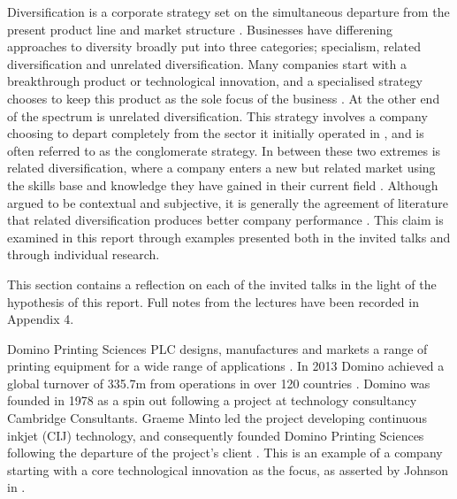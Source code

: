 \documentclass{elec6049Report}     %
\newcommand{\inote}[1] {\todo[inline]{#1}}
\begin{document}
Diversification is a corporate strategy set on the simultaneous departure from the present product line and market structure \cite{ansoff1957strategies}.
Businesses have differening approaches to diversity broadly put into three categories; specialism, related diversification and unrelated diversification. 
Many companies start with a breakthrough product or technological innovation, and a specialised strategy chooses to keep this product as the sole focus of the business \cite{johnson2008exploring}.
At the other end of the spectrum is unrelated diversification.
This strategy involves a company choosing to depart completely from the sector it initially operated in \cite{johnson2008exploring}, and is often referred to as the conglomerate strategy.
In between these two extremes is related diversification, where a company enters a new but related market using the skills base and knowledge they have gained in their current field \cite{johnson2008exploring}. 
Although argued to be contextual and subjective, it is generally the agreement of literature that related diversification produces better company performance \cite{johnson2008exploring, SMJ:SMJ334, SMJ:SMJ82}. 
This claim is examined in this report through examples presented both in the invited talks and through individual research.







 \label{Sect1}
This section contains a reflection on each of the invited talks in the light of the hypothesis of this report. Full notes from the lectures have been recorded in Appendix 4.

Domino Printing Sciences PLC designs, manufactures and markets a range of printing equipment for a wide range of applications \cite{DominoAnnual}. 
In 2013 Domino achieved a global turnover of \textsterling335.7m from operations in over 120 countries \cite{DominoFactsheet}. 
Domino was founded in 1978 \cite{DominoFactsheet} as a spin out following a project at technology consultancy Cambridge Consultants.
Graeme Minto led the project developing continuous inkjet (CIJ) technology, and consequently founded Domino Printing Sciences following the departure of the project's client \cite{goffin2010innovation}.
This is an example of a company starting with a core technological innovation as the focus, as asserted by Johnson in \cite{ johnson2008exploring}.
\end{document}
